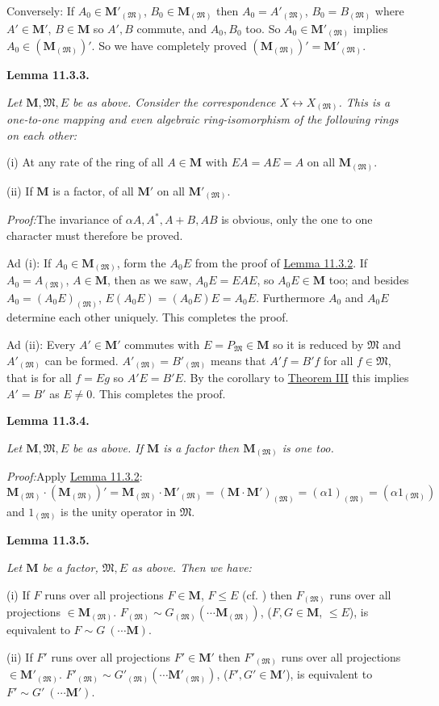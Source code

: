 \documentclass[12pt,b5paper,twoside]{article}
\newcommand{\M}{\mathbf M}
\newcommand{\Lemma}[1]{%
  \par\smallskip\noindent\phantomsection\label{lem:#1}\textbf{Lemma #1.}\enspace
}
\newcommand{\Proof}{\par\noindent\textit{Proof:}\enspace}
\newcommand{\lemref}[1]{\hyperref[lem:#1]{Lemma #1}}
\newcommand{\thmref}[1]{\hyperref[thm:#1]{Theorem #1}}
\begin{document}
Conversely: If $A_0\in\M'_{(\mathfrak M)}$,
$B_0\in\M_{(\mathfrak M)}$ then
$A_0=A'_{(\mathfrak M)}$, $B_0=B_{(\mathfrak M)}$ where
$A'\in\M'$, $B\in\M$ so $A',B$ commute, and $A_0,B_0$ too. So
$A_0\in\M'_{(\mathfrak M)}$ implies
$A_0\in(\M_{(\mathfrak M)})'$. So we have completely proved
$(\M_{(\mathfrak M)})'=\M'_{(\mathfrak M)}$.

\Lemma{11.3.3}
{\itshape
Let $\M,\mathfrak M,E$ be as above. Consider the correspondence
$X\longleftrightarrow X_{(\mathfrak M)}$. This is a one-to-one mapping and
even algebraic ring-isomorphism of the following rings on each other:

(i) At any rate of the ring of all $A\in\M$ with $EA=AE=A$ on all
$\M_{(\mathfrak M)}$.

(ii) If $\M$ is a factor, of all $\M'$ on all
$\M'_{(\mathfrak M)}$.}

\Proof The invariance of $\alpha A,A^*,A+B,AB$ is obvious, only the one to
one character must therefore be proved.

Ad (i): If $A_0\in\M_{(\mathfrak M)}$, form the $A_0E$ from the proof of
\lemref{11.3.2}. If $A_0=A_{(\mathfrak M)}$, $A\in\M$, then as we saw,
$A_0E=EAE$, so $A_0E\in\M$ too; and besides
$A_0=(A_0E)_{(\mathfrak M)}$, $E(A_0E)=(A_0E)E=A_0E$. Furthermore $A_0$
and $A_0E$ determine each other uniquely. This completes the proof.

Ad (ii): Every $A'\in\M'$ commutes with $E=P_{\mathfrak M}\in\M$ so it
is reduced by $\mathfrak M$ and $A'_{(\mathfrak M)}$ can be formed.
$A'_{(\mathfrak M)}=B'_{(\mathfrak M)}$ means that $A'f=B'f$ for all
$f\in\mathfrak M$, that is for all $f=Eg$ so $A'E=B'E$. By the corollary
to \thmref{III} this implies $A'=B'$ as $E\ne0$. This completes the proof.

\Lemma{11.3.4}
{\itshape
Let $\M,\mathfrak M,E$ be as above. If $\M$ is a factor then
$\M_{(\mathfrak M)}$ is one too.}

\Proof Apply \lemref{11.3.2}:
\[
 \M_{(\mathfrak M)}\cdot(\M_{(\mathfrak M)})'
 =\M_{(\mathfrak M)}\cdot\M'_{(\mathfrak M)}
 =(\M\cdot\M')_{(\mathfrak M)}
 =(\alpha1)_{(\mathfrak M)}=(\alpha1_{(\mathfrak M)})
\]
and $1_{(\mathfrak M)}$ is the unity operator in $\mathfrak M$.

\Lemma{11.3.5}
{\itshape
Let $\M$ be a factor, $\mathfrak M,E$ as above. Then we have:

(i) If $F$ runs over all projections $F\in\M$, $F\leq E$ (cf.
\cite[p.~76]{ref16}) then $F_{(\mathfrak M)}$ runs over all projections
$\in\M_{(\mathfrak M)}$.
$F_{(\mathfrak M)}\sim G_{(\mathfrak M)}
(\cdots\M_{(\mathfrak M)})$, ($F,G\in\M$, $\leq E$), is equivalent to
$F\sim G\ (\cdots\M)$.

(ii) If $F'$ runs over all projections $F'\in\M'$ then
$F'_{(\mathfrak M)}$ runs over all projections
$\in\M'_{(\mathfrak M)}$.
$F'_{(\mathfrak M)}\sim G'_{(\mathfrak M)}
(\cdots\M'_{(\mathfrak M)})$, ($F',G'\in\M'$), is equivalent to
$F'\sim G'\ (\cdots\M')$.}
\end{document}
